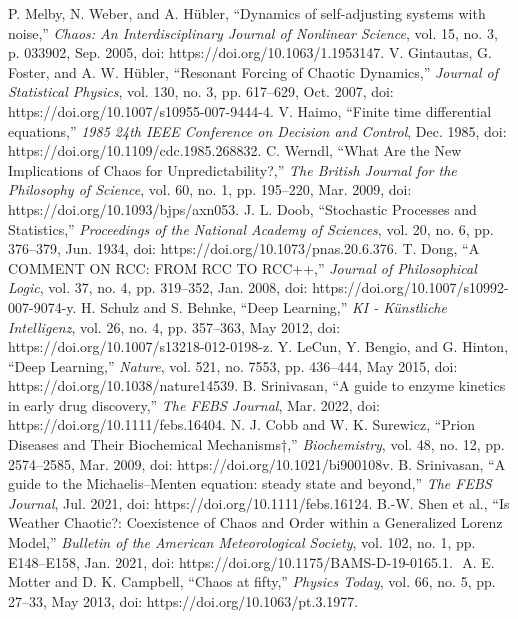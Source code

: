 \documentclass[conference]{IEEEtran}
\begin{document}
\begin{thebibliography}{00}
 P. Melby, N. Weber, and A. Hübler, “Dynamics of self-adjusting systems with noise,” \textit{Chaos: An Interdisciplinary Journal of Nonlinear Science}, vol. 15, no. 3, p. 033902, Sep. 2005, doi: https://doi.org/10.1063/1.1953147.
 V. Gintautas, G. Foster, and A. W. Hübler, “Resonant Forcing of Chaotic Dynamics,” \textit{Journal of Statistical Physics}, vol. 130, no. 3, pp. 617–629, Oct. 2007, doi: https://doi.org/10.1007/s10955-007-9444-4.
 V. Haimo, “Finite time differential equations,” \textit{1985 24th IEEE Conference on Decision and Control}, Dec. 1985, doi: https://doi.org/10.1109/cdc.1985.268832.
 C. Werndl, “What Are the New Implications of Chaos for Unpredictability?,” \textit{The British Journal for the Philosophy of Science}, vol. 60, no. 1, pp. 195–220, Mar. 2009, doi: https://doi.org/10.1093/bjps/axn053.
 J. L. Doob, “Stochastic Processes and Statistics,” \textit{Proceedings of the National Academy of Sciences}, vol. 20, no. 6, pp. 376–379, Jun. 1934, doi: https://doi.org/10.1073/pnas.20.6.376.
 T. Dong, “A COMMENT ON RCC: FROM RCC TO RCC++,” \textit{Journal of Philosophical Logic}, vol. 37, no. 4, pp. 319–352, Jan. 2008, doi: https://doi.org/10.1007/s10992-007-9074-y.
 H. Schulz and S. Behnke, “Deep Learning,” \textit{KI - Künstliche Intelligenz}, vol. 26, no. 4, pp. 357–363, May 2012, doi: https://doi.org/10.1007/s13218-012-0198-z.
 Y. LeCun, Y. Bengio, and G. Hinton, “Deep Learning,” \textit{Nature}, vol. 521, no. 7553, pp. 436–444, May 2015, doi: https://doi.org/10.1038/nature14539.
 B. Srinivasan, “A guide to enzyme kinetics in early drug discovery,” \textit{The FEBS Journal}, Mar. 2022, doi: https://doi.org/10.1111/febs.16404.
 N. J. Cobb and W. K. Surewicz, “Prion Diseases and Their Biochemical Mechanisms†,” \textit{Biochemistry}, vol. 48, no. 12, pp. 2574–2585, Mar. 2009, doi: https://doi.org/10.1021/bi900108v.
 B. Srinivasan, “A guide to the Michaelis–Menten equation: steady state and beyond,” \textit{The FEBS Journal}, Jul. 2021, doi: https://doi.org/10.1111/febs.16124.
 B.-W. Shen et al., “Is Weather Chaotic?: Coexistence of Chaos and Order within a Generalized Lorenz Model,” \textit{Bulletin of the American Meteorological Society}, vol. 102, no. 1, pp. E148–E158, Jan. 2021, doi: https://doi.org/10.1175/BAMS-D-19-0165.1.
‌ A. E. Motter and D. K. Campbell, “Chaos at fifty,” \textit{Physics Today}, vol. 66, no. 5, pp. 27–33, May 2013, doi: https://doi.org/10.1063/pt.3.1977.

\end{thebibliography}
\end{document}
